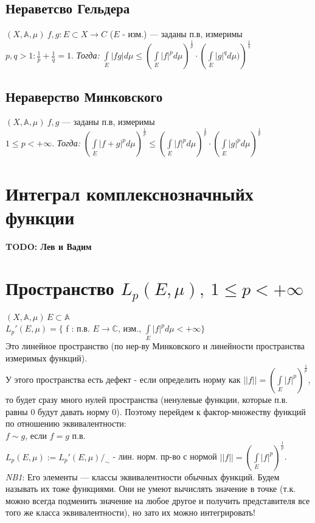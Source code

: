 \documentclass[paper=a4, fontsize=17pt]{article}
\begin{document}
\subsection{Нераветсво Гельдера}
$(X, \mathds{A}, \mu)\ f, g : E \subset X \rightarrow C$ ($E$ - изм.) --- заданы п.в, измеримы\\
$p, q > 1 : \frac{1}{p} + \frac{1}{q} = 1$. 
\emph{Тогда:}
 ${\displaystyle \int\limits_E |fg|d\mu \leq \left(\int\limits_E |f|^p d\mu\right)^\frac{1}{p} \cdot \left(\int\limits_E |g|^q d\mu)\right)^\frac{1}{q}}$
\subsection{Нераверство Минковского}
$(X, \mathds{A}, \mu)\ f, g $ --- заданы п.в, измеримы\\
$1 \leq p < +\infty$. 
\emph{Тогда:}
${\displaystyle \left(\int\limits_E |f + g|^p d\mu \right)^\frac{1}{p} 
\leq \left(\int\limits_E |f|^p d\mu\right)^\frac{1}{p} 
\cdot \left(\int\limits_E |g|^p d\mu\right)^\frac{1}{p}}$

\section{Интеграл комплекснозначныйх функции}
\textbf{TODO: Лев и Вадим}

\section{Пространство $L_p(E,\mu),\ 1 \leq p < +\infty$}
$(X, \mathds{A}, \mu)\, E \subset \mathds{A}$\\
$L_p'(E, \mu) = \{$ f : п.в. $E \rightarrow \mathbb{C}$, изм., $ \int\limits_E |f|^p d\mu < +\infty \}$\\
Это линейное пространство (по нер-ву Минковского и линейности пространства измеримых функций).\\
У этого пространства есть дефект - если определить норму как $||f|| = \left(\int\limits_E |f|^p\right)^\frac{1}{p}$, то будет сразу много нулей пространства (ненулевые функции, которые п.в. равны 0 будут давать норму 0).
Поэтому перейдем к фактор-множеству функций по отношению эквивалентности:\\
$f \sim g$, если $f = g$ п.в.\\
$ L_p(E, \mu) := L_p'(E, \mu) /_{\sim}$ - лин. норм. пр-во с нормой $||f|| = \left(\int\limits_E |f|^p\right)^\frac{1}{p}$.\\

\emph{NB1}: Его элементы --- классы эквивалентности обычных функций. Будем называть их тоже функциями. Они не умеют вычислять значение в точке (т.к. можно всегда подменить значение на любое другое и получить представителя все того же класса эквивалентности), но зато их можно интегрировать!\\
\end{document}
